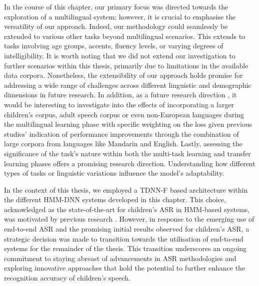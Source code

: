 In the course of this chapter, our primary focus was directed towards the exploration of a multilingual system; however, it is crucial to emphasise the versatility of our approach. Indeed, our methodology could seamlessly be extended to various other tasks beyond multilingual scenarios. This extends to tasks involving age groups, accents, fluency levels, or varying degrees of intelligibility. It is worth noting that we did not extend our investigation to further scenarios within this thesis, primarily due to limitations in the available data corpora. Nonetheless, the extensibility of our approach holds promise for addressing a wide range of challenges across different linguistic and demographic dimensions in future research. In addition, as a future research direction , it would be interesting to investigate into the effects of incorporating a larger children's corpus, adult speech corpus or even non-European languages during the multilingual learning phase with specific weighting on the loss given previous studies' indication of performance improvements through the combination of large corpora from languages like Mandarin and English. Lastly, assessing the significance of the task's nature within both the multi-task learning and transfer learning phases offers a promising research direction. Understanding how different types of tasks or linguistic variations influence the model's adaptability.

In the context of this thesis, we employed a TDNN-F based architecture within the different HMM-DNN systems developed in this chapter. This choice, acknowledged as the state-of-the-art for children's ASR in HMM-based systems, was motivated by previous research \cite{tdnnf-children}. However, in response to the emerging use of end-to-end ASR and the promising initial results observed for children's ASR, a strategic decision was made to transition towards the utilisation of end-to-end systems for the remainder of the thesis. This transition underscores an ongoing commitment to staying abreast of advancements in ASR methodologies and exploring innovative approaches that hold the potential to further enhance the recognition accuracy of children's speech.

